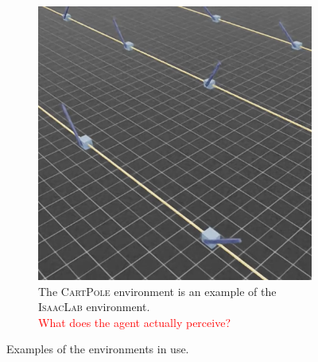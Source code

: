 \documentclass[10pt]{article} %
\begin{document}
\begin{figure}
\begin{subfigure}[b]{0.32\textwidth}
    \includegraphics[width=\textwidth]{figures/isaac.png}
    \caption{The \textsc{CartPole} environment is an example of the \textsc{IsaacLab} environment.\\\textcolor{red}{What does the agent actually perceive?}\\}
    \label{fig:sample-env-isaac}
  \end{subfigure}
  \caption{Examples of the environments in use.}
  \vspace{-12pt}
  \label{fig:environmnents}
\end{figure}
\end{document}
